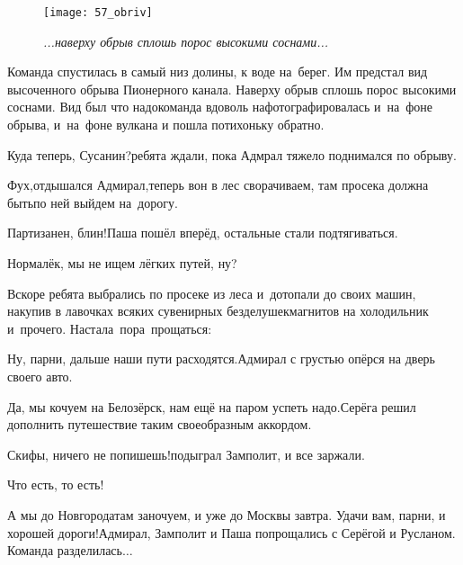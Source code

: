 \begin{figure}[h]
	\centering
	\texttt{[image: 57\_obriv]}
	\caption{\small\textit{...наверху обрыв сплошь порос высокими соснами...}}
\end{figure}

Команда спустилась в самый низ долины, к воде на~берег. Им предстал вид высоченного обрыва Пионерного канала. Наверху обрыв сплошь порос высокими соснами. Вид был что надо\mdash команда вдоволь нафотографировалась и~на~фоне обрыва, и~на~фоне вулкана и пошла потихоньку обратно.

\diagdash Куда теперь, Сусанин?\mdash ребята ждали, пока Адмрал тяжело поднимался по обрыву.

\diagdash Фух,\mdash отдышался Адмирал,\mdash теперь вон в лес сворачиваем, там просека должна быть\mdash по ней выйдем на~дорогу.

\diagdash Партизанен, блин!\mdash Паша пошёл вперёд, остальные стали подтягиваться.

\diagdash Нормалёк, мы не ищем лёгких путей, ну?


Вскоре ребята выбрались по просеке из леса и~дотопали до своих машин, накупив в лавочках всяких сувенирных безделушек\mdash магнитов на холодильник и~прочего. Настала~пора~прощаться:

\diagdash Ну, парни, дальше наши пути расходятся.\mdash Адмирал с грустью опёрся на дверь своего авто.

\diagdash Да, мы кочуем на Белозёрск, нам ещё на паром успеть надо.\mdash Серёга решил дополнить путешествие таким своеобразным аккордом.

\diagdash Скифы, ничего не попишешь!\mdash подыграл Замполит, и все заржали.

\diagdash Что есть, то есть! 

\diagdash А мы до Новгорода\mdash там заночуем, и уже до Москвы завтра. Удачи вам, парни, и хорошей дороги!\mdash Адмирал, Замполит и Паша попрощались с Серёгой и Русланом. Команда разделилась$\ldots$

